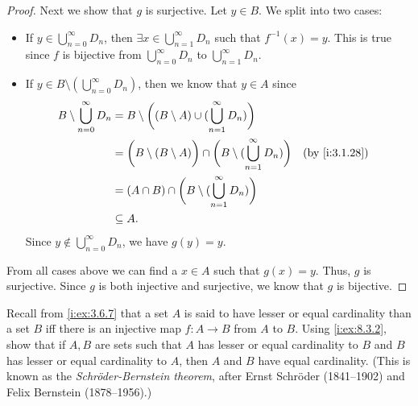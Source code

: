 \begin{proof}
  Next we show that \(g\) is surjective.
  Let \(y \in B\).
  We split into two cases:
  \begin{itemize}
    \item If \(y \in \bigcup_{n = 0}^\infty D_n\), then \(\exists x \in \bigcup_{n = 1}^\infty D_n\) such that \(f^{-1}(x) = y\).
          This is true since \(f\) is bijective from \(\bigcup_{n = 0}^\infty D_n\) to \(\bigcup_{n = 1}^\infty D_n\).
    \item If \(y \in B \setminus (\bigcup_{n = 0}^\infty D_n)\), then we know that \(y \in A\) since
          \begin{align*}
            B \setminus \bigcup_{n = 0}^\infty D_n & = B \setminus \bigg((B \setminus A) \cup (\bigcup_{n = 1}^\infty D_n)\bigg)                                            \\
                                                   & = \bigg(B \setminus (B \setminus A)\bigg) \cap \bigg(B \setminus (\bigcup_{n = 1}^\infty D_n)\bigg) &  & \by{i:3.1.28} \\
                                                   & = (A \cap B) \cap \bigg(B \setminus (\bigcup_{n = 1}^\infty D_n)\bigg)                                                 \\
                                                   & \subseteq A.
          \end{align*}
          Since \(y \notin \bigcup_{n = 0}^\infty D_n\), we have \(g(y) = y\).
  \end{itemize}
  From all cases above we can find a \(x \in A\) such that \(g(x) = y\).
  Thus, \(g\) is surjective.
  Since \(g\) is both injective and surjective, we know that \(g\) is bijective.
\end{proof}

\begin{ex}\label{i:ex:8.3.3}
  Recall from \cref{i:ex:3.6.7} that a set \(A\) is said to have lesser or equal cardinality than a set \(B\) iff there is an injective map \(f : A \to B\) from \(A\) to \(B\).
  Using \cref{i:ex:8.3.2}, show that if \(A, B\) are sets such that \(A\) has lesser or equal cardinality to \(B\) and \(B\) has lesser or equal cardinality to \(A\), then \(A\) and \(B\) have equal cardinality.
  (This is known as the \emph{Schröder-Bernstein theorem}, after Ernst Schröder (1841--1902) and Felix Bernstein (1878--1956).)
\end{ex}

